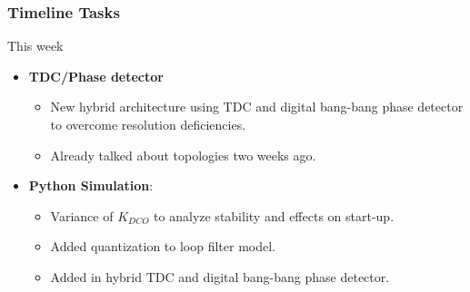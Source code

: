 \documentclass[t, screen, aspectratio=43]{beamer}
\begin{document}
\begin{frame}
	\frametitle{Timeline Tasks}
	\begin{block}{This week}
		\begin{itemize}
			\footnotesize
			\item \textbf{TDC/Phase detector}
			\begin{itemize}
				\footnotesize
				\item New hybrid architecture using TDC and digital bang-bang phase detector to overcome resolution deficiencies.
				\item Already talked about topologies two weeks ago.
			\end{itemize} 
			\item \textbf{Python Simulation}:
			\begin{itemize}
				\footnotesize
				\item Variance of $K_{DCO}$ to analyze stability and effects on start-up.
				\item Added quantization to loop filter model.
				\item Added in hybrid TDC and digital bang-bang phase detector.
			\end{itemize} 
		\end{itemize}    
	\end{block}
\end{frame}

\end{document}
